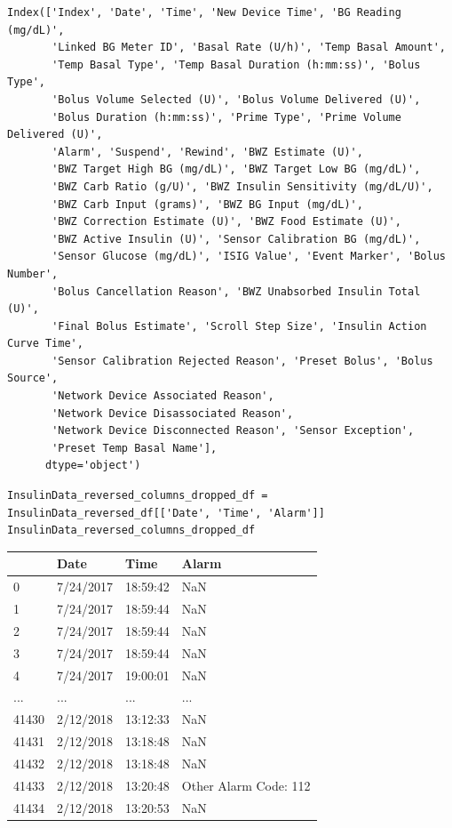 \begin{verbatim}
Index(['Index', 'Date', 'Time', 'New Device Time', 'BG Reading (mg/dL)',
       'Linked BG Meter ID', 'Basal Rate (U/h)', 'Temp Basal Amount',
       'Temp Basal Type', 'Temp Basal Duration (h:mm:ss)', 'Bolus Type',
       'Bolus Volume Selected (U)', 'Bolus Volume Delivered (U)',
       'Bolus Duration (h:mm:ss)', 'Prime Type', 'Prime Volume Delivered (U)',
       'Alarm', 'Suspend', 'Rewind', 'BWZ Estimate (U)',
       'BWZ Target High BG (mg/dL)', 'BWZ Target Low BG (mg/dL)',
       'BWZ Carb Ratio (g/U)', 'BWZ Insulin Sensitivity (mg/dL/U)',
       'BWZ Carb Input (grams)', 'BWZ BG Input (mg/dL)',
       'BWZ Correction Estimate (U)', 'BWZ Food Estimate (U)',
       'BWZ Active Insulin (U)', 'Sensor Calibration BG (mg/dL)',
       'Sensor Glucose (mg/dL)', 'ISIG Value', 'Event Marker', 'Bolus Number',
       'Bolus Cancellation Reason', 'BWZ Unabsorbed Insulin Total (U)',
       'Final Bolus Estimate', 'Scroll Step Size', 'Insulin Action Curve Time',
       'Sensor Calibration Rejected Reason', 'Preset Bolus', 'Bolus Source',
       'Network Device Associated Reason',
       'Network Device Disassociated Reason',
       'Network Device Disconnected Reason', 'Sensor Exception',
       'Preset Temp Basal Name'],
      dtype='object')
\end{verbatim}

\begin{verbatim}
InsulinData_reversed_columns_dropped_df = InsulinData_reversed_df[['Date', 'Time', 'Alarm']]
InsulinData_reversed_columns_dropped_df
\end{verbatim}

\bigskip\noindent
\begin{tabular}{p{}p{}p{}p{}}
\toprule
 & Date & Time & Alarm \\
\hline
0 & 7/24/2017 & 18:59:42 & NaN \\
\hline
1 & 7/24/2017 & 18:59:44 & NaN \\
\hline
2 & 7/24/2017 & 18:59:44 & NaN \\
\hline
3 & 7/24/2017 & 18:59:44 & NaN \\
\hline
4 & 7/24/2017 & 19:00:01 & NaN \\
\hline
... & ... & ... & ... \\
\hline
41430 & 2/12/2018 & 13:12:33 & NaN \\
\hline
41431 & 2/12/2018 & 13:18:48 & NaN \\
\hline
41432 & 2/12/2018 & 13:18:48 & NaN \\
\hline
41433 & 2/12/2018 & 13:20:48 & Other Alarm Code: 112 \\
\hline
41434 & 2/12/2018 & 13:20:53 & NaN \\
\hline
\bottomrule
\end{tabular}

